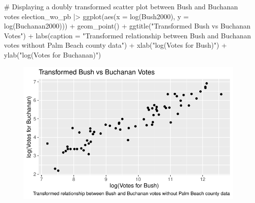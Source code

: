 \documentclass[
  letterpaper,
  DIV=11,
  numbers=noendperiod]{scrartcl}
\newenvironment{Shaded}{\begin{snugshade}}{\end{snugshade}}
\newcommand{\AttributeTok}[1]{\textcolor[rgb]{0.40,0.45,0.13}{#1}}
\newcommand{\CommentTok}[1]{\textcolor[rgb]{0.37,0.37,0.37}{#1}}
\newcommand{\FunctionTok}[1]{\textcolor[rgb]{0.28,0.35,0.67}{#1}}
\newcommand{\NormalTok}[1]{\textcolor[rgb]{0.00,0.23,0.31}{#1}}
\newcommand{\SpecialCharTok}[1]{\textcolor[rgb]{0.37,0.37,0.37}{#1}}
\newcommand{\StringTok}[1]{\textcolor[rgb]{0.13,0.47,0.30}{#1}}
\begin{document}
\begin{Shaded}
\begin{Highlighting}[]
\CommentTok{\# Displaying a doubly transformed scatter plot between Bush and Buchanan votes}
\NormalTok{election\_wo\_pb }\SpecialCharTok{|\textgreater{}} \FunctionTok{ggplot}\NormalTok{(}\FunctionTok{aes}\NormalTok{(}\AttributeTok{x =} \FunctionTok{log}\NormalTok{(Bush2000), }\AttributeTok{y =} \FunctionTok{log}\NormalTok{(Buchanan2000))) }\SpecialCharTok{+} \FunctionTok{geom\_point}\NormalTok{() }\SpecialCharTok{+} \FunctionTok{ggtitle}\NormalTok{(}\StringTok{"Transformed Bush vs Buchanan Votes"}\NormalTok{) }\SpecialCharTok{+} \FunctionTok{labs}\NormalTok{(}\AttributeTok{caption =} \StringTok{"Transformed relationship between Bush and Buchanan votes without Palm Beach county data"}\NormalTok{) }\SpecialCharTok{+} \FunctionTok{xlab}\NormalTok{(}\StringTok{"log(Votes for Bush)"}\NormalTok{) }\SpecialCharTok{+} \FunctionTok{ylab}\NormalTok{(}\StringTok{"log(Votes for Buchanan)"}\NormalTok{)}
\end{Highlighting}
\end{Shaded}

\begin{figure}[H]

{\centering \includegraphics{case_study_1_files/figure-pdf/unnamed-chunk-6-18.pdf}

}

\end{figure}
\end{document}
